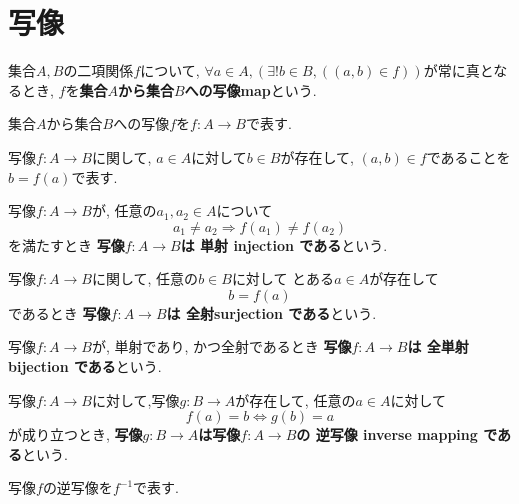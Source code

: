\section{写像}
\begin{comment}
\begin{mean}
{\bf 規則}とは, 手続きが, それに基づいて行われるように定めた事柄のことである.\end{mean}
\begin{mean}
{\bf 決定する}とは, はっきりと決まることである.
\end{mean}
\begin{usage}
集合$A$と集合$B$に関して, ある規則が存在して, 任意の$a\in A$に対して$b\in B$が決定するとき,
{\bf 「$a\in A$と$b\in B$が対応する」},
{\bf 「$b\in B$が$a\in A$に対応する」},
{\bf 「$a\in A$に対応する$b\in B$が存在する」}といえる.
\end{usage}
\end{comment}
\begin{Def}
集合$A,B$の二項関係$f$について,
$\forall a\in A, (\exists! b\in B, ((a,b)\in f))$が常に真となるとき, $f$を{\bf 集合$A$から集合$B$への写像map}という.
\end{Def}
\begin{Notation}
集合$A$から集合$B$への写像$f$を$f:A\rightarrow B$で表す.
\end{Notation}
\begin{Notation}
写像$f:A\rightarrow B$に関して, $a\in A$に対して$b\in B$が存在して, $(a,b)\in f$であることを$b=f(a)$で表す.
\end{Notation}
\begin{Def}
写像$f:A\rightarrow B$が,
任意の$a_1,a_2\in A$について
\[
a_1\neq a_2\Rightarrow f(a_1)\neq f(a_2)
\]
を満たすとき
{\bf 写像$f:A\rightarrow B$は
単射 injection
である}という.
\end{Def}
\begin{Def}
写像$f:A\rightarrow B$に関して,
任意の$b\in B$に対して
とある$a\in A$が存在して
\[
b=f(a)
\]
であるとき
{\bf 写像$f:A\rightarrow B$は
全射surjection 
である}という.
\end{Def}
\begin{Def}
写像$f:A\rightarrow B$が, 単射であり, かつ全射であるとき
{\bf 写像$f:A\rightarrow B$は
全単射 bijection
である}という.
\end{Def}

\begin{Def}
写像$f:A\rightarrow B$に対して,写像$g:B\rightarrow A$が存在して, 任意の$a\in A$に対して
\[
f(a)=b \Leftrightarrow g(b)=a
\]
が成り立つとき, 
{\bf 写像$g:B\rightarrow A$は写像$f:A\rightarrow B$の
逆写像 inverse mapping
である}という.
\end{Def}
\begin{Notation}
写像$f$の逆写像を$f^{-1}$で表す.
\end{Notation}

